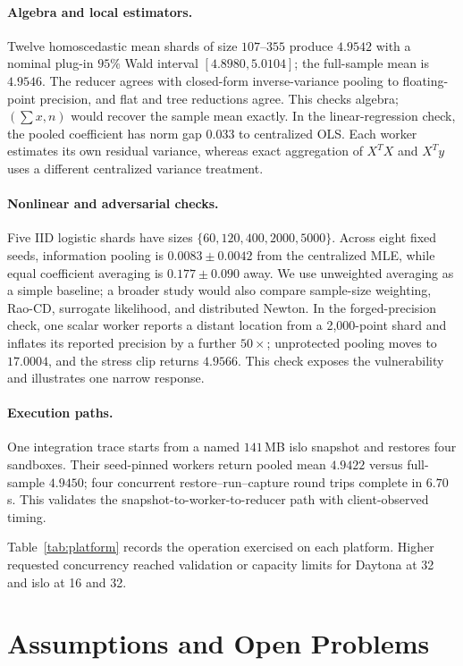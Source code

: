 \paragraph{Algebra and local estimators.}
Twelve homoscedastic mean shards of size $107$--$355$ produce $4.9542$ with a nominal plug-in
$95\%$ Wald interval $[4.8980,5.0104]$; the full-sample mean is $4.9546$. The reducer agrees
with closed-form inverse-variance pooling to floating-point precision, and flat and tree
reductions agree. This checks algebra; $(\sum x,n)$ would recover the sample mean exactly. In
the linear-regression check, the pooled coefficient has norm gap $0.033$ to centralized OLS.
Each worker estimates its own residual variance, whereas exact aggregation of $X^TX$ and $X^Ty$
uses a different centralized variance treatment.

\paragraph{Nonlinear and adversarial checks.}
Five IID logistic shards have sizes $\{60,120,400,2000,5000\}$. Across eight fixed seeds,
information pooling is $0.0083\pm0.0042$ from the centralized MLE, while equal coefficient
averaging is $0.177\pm0.090$ away. We use unweighted averaging as a simple baseline; a broader
study would also compare sample-size weighting, Rao-CD, surrogate likelihood, and distributed
Newton. In the forged-precision check, one scalar worker reports a
distant location from a
2,000-point shard and inflates its reported precision by a further $50\times$; unprotected
pooling moves to $17.0004$, and the stress
clip returns $4.9566$. This check exposes the vulnerability and illustrates one narrow response.

\paragraph{Execution paths.}
One integration trace starts from a named $141$\,MB islo snapshot and restores four sandboxes.
Their seed-pinned workers return pooled mean $4.9422$ versus full-sample $4.9450$; four
concurrent restore--run--capture round trips complete in $6.70$\,s. This validates the
snapshot-to-worker-to-reducer path with client-observed timing.

Table~\ref{tab:platform} records the operation exercised on each platform. Higher requested
concurrency reached validation or capacity limits for Daytona at 32 and islo at 16 and 32.

\section{Assumptions and Open Problems}
\label{sec:agenda}

